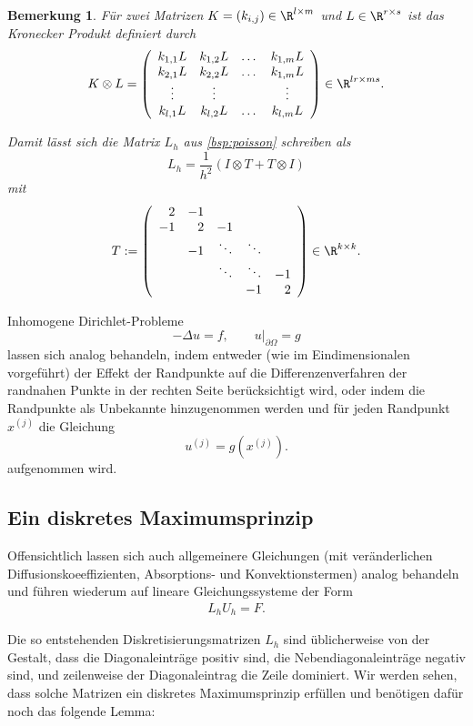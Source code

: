 \documentclass[
]{mycourse}
\theoremstyle{mythm}
\newtheorem{bemerkung}[theorem]{Bemerkung}
\theoremstyle{break}
\begin{document}
\begin{bemerkung}
Für zwei Matrizen $K=(k_{i,j})\in \R^{l \times m}$ und $L\in \R^{r \times s}$ ist das \emph{Kronecker Produkt} definiert durch
\[
K\otimes L =  \left( \begin{array}{c c c c} k_{1,1} L & k_{1,2}L & \dots & k_{1,m}L \\ k_{2,1} L & k_{2,2}L & \dots & k_{1,m}L \\ \vdots & \vdots & & \vdots\\
k_{l,1} L & k_{l,2}L & \dots & k_{l,m}L\end{array} \right) \in \R^{lr\times ms}.
\]

Damit lässt sich die Matrix $L_h$ aus \ref{bsp:poisson} schreiben als
\[
L_h=\frac{1}{h^2} \left( I \otimes T + T \otimes I \right)
\]
mit
\[
T:=\left( \begin{array}{r r r r r} 2 & -1\\ -1 & 2 & -1\\ & -1 & \ddots & \ddots\\ & & \ddots & \ddots & -1\\ & & & -1 & 2\end{array}\right)\in \R^{k\times k}.
\]
\end{bemerkung}

Inhomogene Dirichlet-Probleme
\[
-\Delta u =f, \qquad u|_{\partial \Omega}=g
\]
lassen sich analog behandeln, indem entweder (wie im Eindimensionalen vorgeführt) der Effekt der Randpunkte auf die Differenzenverfahren der randnahen Punkte  
in der rechten Seite berücksichtigt wird, oder indem die Randpunkte als Unbekannte hinzugenommen werden und für jeden Randpunkt $x^{(j)}$
die Gleichung
\[
u^{(j)}=g(x^{(j)}).
\]
aufgenommen wird.


\subsection{Ein diskretes Maximumsprinzip}

Offensichtlich lassen sich auch allgemeinere Gleichungen (mit veränderlichen Diffusionskoeeffizienten, Absorptions- und Konvektionstermen)
analog behandeln und führen wiederum auf lineare Gleichungssysteme der Form
\begin{align*}
L_h U_h =F.
\end{align*}

Die so entstehenden Diskretisierungsmatrizen $L_h$ sind üblicherweise von der Gestalt, dass die Diagonaleinträge positiv sind, die Nebendiagonaleinträge
negativ sind, und zeilenweise der Diagonaleintrag die Zeile dominiert. 
Wir werden sehen, dass solche Matrizen ein diskretes Maximumsprinzip erfüllen und benötigen dafür noch das folgende Lemma:
\end{document}

